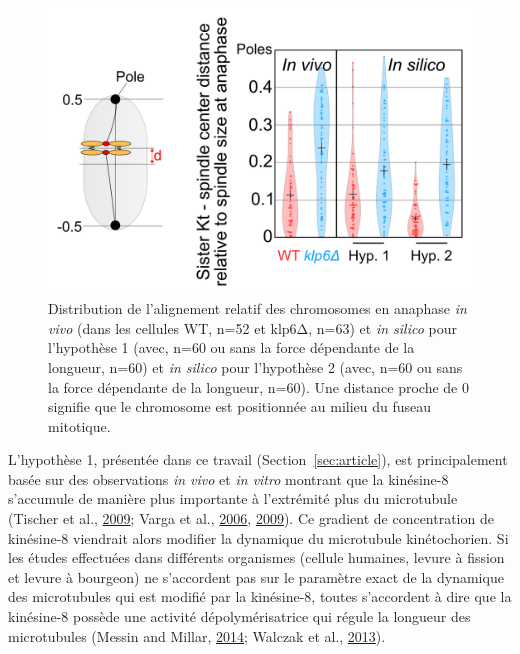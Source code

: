\documentclass[12pt,a4paper,twoside,openright]{book}
\begin{document}
\begin{figure}[htbp]
\centering
\includegraphics{figures/results/modelling/ch_alignment.png}
\caption[Distribution de l'alignement relatif des chromosomes en anaphase]{\label{fig:ch-alignment}Distribution
de l'alignement relatif des chromosomes en anaphase \emph{in vivo} (dans
les cellules WT, n=52 et klp6Δ, n=63) et \emph{in silico} pour
l'hypothèse 1 (avec, n=60 ou sans la force dépendante de la longueur,
n=60) et \emph{in silico} pour l'hypothèse 2 (avec, n=60 ou sans la
force dépendante de la longueur, n=60). Une distance proche de 0
signifie que le chromosome est positionnée au milieu du fuseau
mitotique.}
\end{figure}

L'hypothèse 1, présentée dans ce travail (Section~\ref{sec:article}),
est principalement basée sur des observations \emph{in vivo} et \emph{in
vitro} montrant que la kinésine-8 s'accumule de manière plus importante
à l'extrémité plus du microtubule (Tischer et al.,
\protect\hyperlink{ref-Tischer2009}{2009}; Varga et al.,
\protect\hyperlink{ref-Varga2006}{2006},
\protect\hyperlink{ref-Varga2009}{2009}). Ce gradient de concentration
de kinésine-8 viendrait alors modifier la dynamique du microtubule
kinétochorien. Si les études effectuées dans différents organismes
(cellule humaines, levure à fission et levure à bourgeon) ne s'accordent
pas sur le paramètre exact de la dynamique des microtubules qui est
modifié par la kinésine-8, toutes s'accordent à dire que la kinésine-8
possède une activité dépolymérisatrice qui régule la longueur des
microtubules (Messin and Millar,
\protect\hyperlink{ref-Messin2014}{2014}; Walczak et al.,
\protect\hyperlink{ref-Walczak2013a}{2013}).
\end{document}

